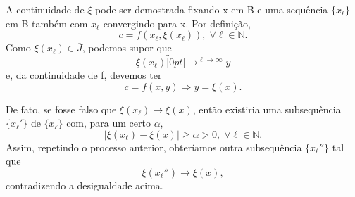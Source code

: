 \documentclass[../analysisII_notes.tex]{subfiles}
\begin{document}
\begin{tcolorbox}[
		skin=enhanced,
		title=Observação,
		fonttitle=\bfseries,
		colframe=black,
		colbacktitle=cyan!75!white,
		colback=cyan!15,
		colbacklower=black,
		coltitle=black,
		drop fuzzy shadow,
	]
	A continuidade de \(\xi \) pode ser demostrada fixando x em B e uma sequência \(\{x_{\ell}\} \) em B também com \(x_{\ell}\) convergindo para x. Por definição,
	\[
		c = f(x_{\ell}, \xi (x_{\ell})),\; \forall \ell \in \mathbb{N}.
	\]
	Como \(\xi (x_{\ell})\in \overline{J}\), podemos supor que
	\[
		\xi (x_{\ell})\overbracket[0pt]{\longrightarrow}^{\ell \to \infty}y
	\]
	e, da continuidade de f, devemos ter
	\[
		c = f(x, y) \Rightarrow y = \xi (x).
	\]

	De fato, se fosse falso que \(\xi (x_{\ell})\rightarrow \xi (x)\), então existiria uma subsequência \(\{x_{\ell }' \}\) de \(\{x_{\ell}\}\) com, para um certo \(\alpha \),
	\[
		|\xi (x_{\ell}) - \xi (x)|\geq \alpha > 0,\; \forall \ell \in \mathbb{N}.
	\]
	Assim, repetindo o processo anterior, obteríamos outra subsequência \(\{x_{\ell }''\}\) tal que
	\[
		\xi (x_{\ell }'')\rightarrow \xi (x),
	\]
	contradizendo a desigualdade acima.
\end{tcolorbox}
\end{document}
